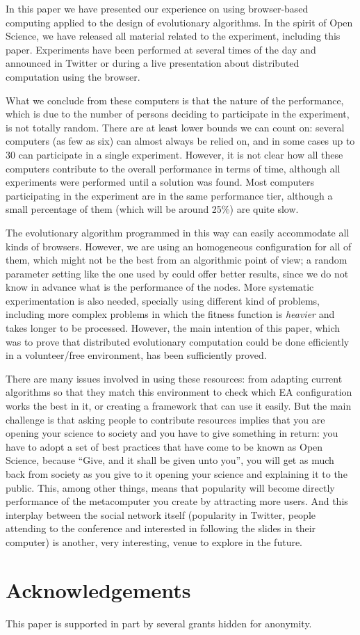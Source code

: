 \documentclass{sig-alternate}
\begin{document}
In this paper we have presented our experience on using browser-based
computing applied to the design of evolutionary algorithms. In the
spirit of Open Science, we have released all material related to the
experiment, including this paper. Experiments have been performed at
several times of the day and announced in Twitter or during a live
presentation about distributed computation using the browser. 

What we conclude from these computers is that the nature of the
performance, which is due to the number of persons deciding to
participate in the experiment, is not totally random. There are at
least lower bounds we can count on: several computers (as few as six)
can almost always be relied on, and in some cases up to 30 can
participate in a single experiment. However, it is not clear how all
these computers contribute to the overall performance in terms of
time, although all experiments were performed until a solution was
found. Most computers participating in the experiment are in the same
performance tier, although a small percentage of them (which will be
around 25\%) are quite slow.

The evolutionary algorithm programmed in this way can easily
accommodate all kinds of browsers. However, we are using an homogeneous
configuration for all of them, which might not be the best from an
algorithmic point of view; a random parameter setting like the one
used by \cite{LNCS86720702} could offer better results, since we do
not know in advance what is the performance of the nodes. More
systematic experimentation is also needed, specially using different
kind of problems, including more complex problems in which the fitness
function is {\em heavier} and takes longer to be processed. However,
the main intention of this paper, which was to prove that distributed
evolutionary computation could be done efficiently in a volunteer/free
environment, has been sufficiently proved. 

There are many issues involved in using these resources: from adapting
current algorithms so that they match this environment 
to check which EA configuration works the best in it, or creating a
framework that can use it easily. But the main
challenge is that asking people to contribute resources implies that
you are opening your science to society and you have to give something
in return: you have to adopt a set of best practices that have come to
be known as Open Science, because ``Give, and it shall be given unto
you'', you will get as much back from society as you give to it
opening your science and explaining it to the public. This, among
other things, means that popularity will become directly performance
of the metacomputer you create by attracting more users. And this
interplay between the social network itself (popularity in Twitter,
people attending to the conference and interested in following the
slides in their computer) is another, very interesting, venue to
explore in the future. 

\section{Acknowledgements}

This paper is supported in part by several grants hidden for
anonymity. 



\end{document}
